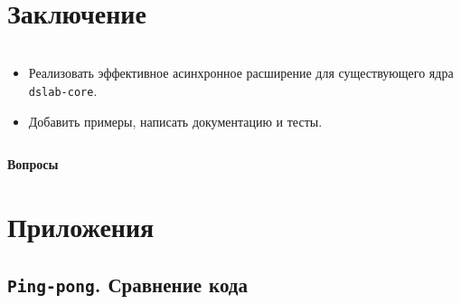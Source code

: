 \documentclass[t]{beamer}  %
\begin{document}
\section{Заключение}

\begin{frame}[fragile]
	\frametitle{\insertsection} 
	\framesubtitle{\insertsubsection}

	\vspace{-0.5cm}
	\begin{columns}
		\begin{column}{1.1\linewidth}
			\begin{itemize}
				\item[\ding{51}] Реализовать эффективное асинхронное расширение для существующего ядра \texttt{dslab-core}.
				\item[\ding{51}] Добавить примеры, написать документацию и тесты.
			\end{itemize}
		\end{column}
	\end{columns}
\end{frame}

\begin{frame}{}
	\centering
	\vspace{3.5cm}
\Huge \textcolor{HSEblue}{\textbf{Вопросы}}

\end{frame}


\section{Приложения}

 \subsection{\texttt{Ping-pong}. Сравнение кода}
\end{document}
